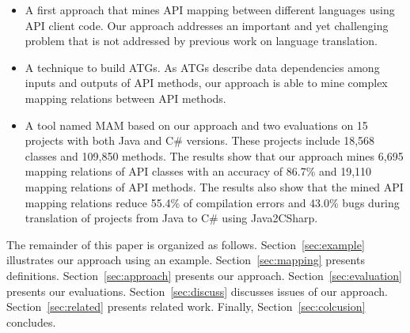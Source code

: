 \begin{itemize}\vspace*{-1.5ex}
\item A first approach that mines API mapping between
different languages using API client code. Our
approach addresses an important and yet challenging problem that is not
addressed by previous work on language translation.\vspace*{-1.5ex}
\item A technique to build ATGs. As ATGs describe data dependencies among
inputs and outputs of API methods, our approach is able to mine
complex mapping relations between API methods.\vspace*{-1.5ex}
\item A tool named MAM based on our approach and two
evaluations on 15 projects with both Java and C\# versions. These
projects include 18,568 classes and 109,850 methods. The results
show that our approach mines 6,695 mapping relations of API classes
with an accuracy of 86.7\% and 19,110 mapping relations of API methods.
The results also show that the mined API mapping relations reduce
55.4\% of compilation errors and 43.0\% bugs during translation of
projects from Java to C\# using Java2CSharp.
\end{itemize}\vspace*{-1.5ex}

The remainder of this paper is organized as follows. Section~\ref{sec:example}
illustrates our approach using an example. Section~\ref{sec:mapping}
presents definitions. Section~\ref{sec:approach} presents our
approach. Section~\ref{sec:evaluation} presents our evaluations.
Section~\ref{sec:discuss} discusses issues of our approach.
Section~\ref{sec:related} presents related work. Finally,
Section~\ref{sec:colcusion} concludes.
